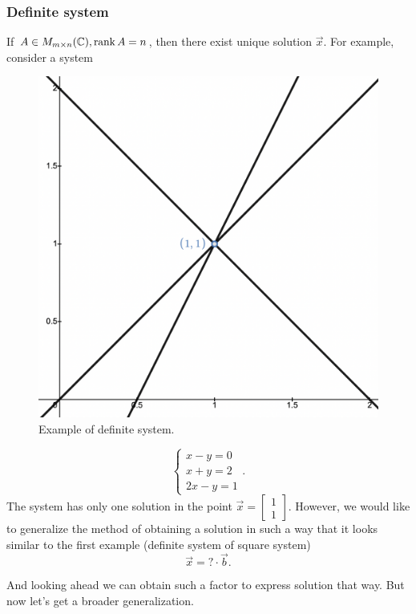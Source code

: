 \subsubsection*{Definite system}
    \Ex If $A \in M_{m\times n}(\mathbb{C}), \operatorname{rank} A=n$, then there exist unique solution $\vec{x}$. For example, consider a system 
        \begin{figure}
            \includegraphics[width=0.4\columnwidth]{lectures/images/definite_system.png}
            \caption*{\scriptsize{Example of definite system.}}
            \label{fig:definite_system}
        \end{figure}
        \[
            \left\{
                \begin{array}{l}
                    x-y = 0\\
                    x+y = 2\\
                    2x-y = 1
                \end{array}.
            \right.  
        \]
        The system has only one solution in the point $\vec{x} = \begin{bmatrix}1\\ 1\end{bmatrix}$. However, we would like to generalize the method of obtaining a solution in such a way that it looks similar to the first example (definite system of square system)
        \[
            \vec{x} = ?\cdot \vec{b}.  
        \]
    
        And looking ahead we can obtain such a factor to express solution that way. But now let's get a broader generalization.\newpage

